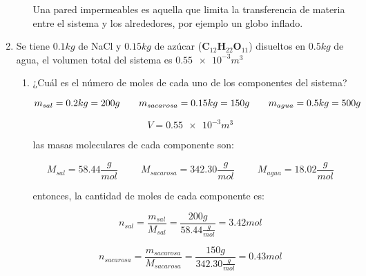 \documentclass[12pt,a4paper]{article}
\begin{document}
\begin{enumerate}
\begin{enumerate}
        Una pared impermeables es aquella que limita la transferencia de materia entre el sistema y los alrededores, por ejemplo un globo inflado.
    \end{enumerate}
    
    
    \item Se tiene $0.1 kg$ de NaCl y $0.15 kg$ de azúcar ($\mathbf{C}_{12}\mathbf{H}_{22}\mathbf{O}_{11}$) disueltos en $0.5kg$ de agua, el volumen total del sistema es $\num{0.55e-3}m^3$
    
    \begin{enumerate}
        \item ¿Cuál es el número de moles de cada uno de los componentes del sistema?
        
        \begin{equation*}
            m_{sal} = 0.2 kg = 200 g \hspace{0.7cm} m_{sacarosa} = 0.15 kg = 150 g \hspace{0.7cm} m_{agua} = 0.5 kg = 500 g \hspace{0.7cm} 
        \end{equation*}
        
        \begin{equation*}
            V = \num{0.55e-3}m^3
        \end{equation*}
        
        las masas moleculares de cada componente son:
        
        \begin{equation*}
            M_{sal} = 58.44 \frac{g}{mol} \hspace{1cm} M_{sacarosa}= 342.30 \frac{g}{mol}   \hspace{1cm} M_{agua} = 18.02 \frac{g}{mol}
        \end{equation*}
        
        entonces, la cantidad de moles de cada componente es:
        
        \begin{equation*}
            n_{sal} = \frac{m_{sal}}{M_{sal}} = \frac{200 g}{58.44 \frac{g}{mol}} = 3.42 mol
        \end{equation*}
        
        \begin{equation*}
            n_{sacarosa} = \frac{m_{sacarosa}}{M_{sacarosa}} = \frac{150 g}{342.30 \frac{g}{mol}} = 0.43 mol
        \end{equation*}
        

\end{enumerate}
\end{enumerate}
\end{document}
